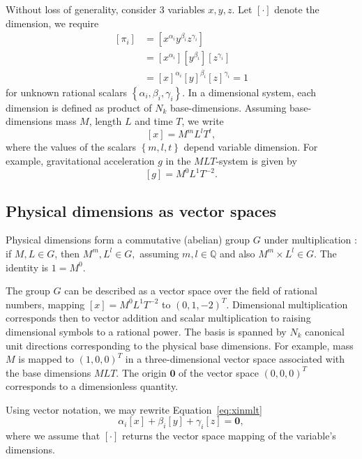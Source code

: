 \documentclass[11pt]{article}
\begin{document}
Without loss of generality, consider 3 variables $x,y,z$. Let $\left[\cdot\right]$ denote the dimension, we require
\begin{align}
    \left[\pi_i\right] &= \left[x^{\alpha_i}y^{\beta_i}z^{\gamma_i} \right] \\
    &=\left[x^{\alpha_i}\right]\left[y^{\beta_i}\right]\left[z^{\gamma_i}\right] \\
    &=\left[x\right]^{\alpha_i}\left[y\right]^{\beta_i}\left[z\right]^{\gamma_i} = 1 \label{eq:pi}    
\end{align}
for unknown rational scalars $\left\{\alpha_i,\beta_i,\gamma_i\right\}.$ In a dimensional system, each dimension is defined as product of $N_k$ base-dimensions. Assuming base-dimensions mass $M$, length $L$ and time $T$, we write 
\begin{equation}
    \left[x\right] = M^mL^lT^t, \label{eq:xinmlt}
\end{equation}
where the values of the scalars $\left\{m,l,t\right\}$ depend variable dimension. For example, gravitational acceleration $g$ in the $MLT$-system is given by
\begin{equation}
    \left[g\right] = M^0L^1T^{-2}.
\end{equation}

\subsection{Physical dimensions as vector spaces}
Physical dimensions form a commutative (abelian) group $G$ under multiplication : if $M,L \in G$, then $M^m,L^l \in G,$ assuming $m,l \in \mathbb{Q}$ and also $M^m \times L^l \in G$. The identity is $1 = M^0$.

The group $G$ can be described as a vector space over the field of rational numbers, mapping $[x] = M^0L^1T^{-2}$ to $(0,1,-2)^T$. Dimensional multiplication corresponds then to vector addition and scalar multiplication to raising dimensional symbols to a rational power. The basis is spanned by $N_k$ canonical unit directions corresponding to the physical base dimensions. For example, mass $M$ is mapped to $(1,0,0)^T$ in a three-dimensional vector space associated with the base dimensions $MLT$. The origin $\mathbf{0}$ of the vector space $(0,0,0)^T$ corresponds to a dimensionless quantity.

Using vector notation, we may rewrite Equation~\ref{eq:xinmlt}
\begin{equation}
    \alpha_i[x] + \beta_i[y] + \gamma_i[z] = \mathbf{0}, \label{eq:zeroeq}
\end{equation}
where we assume that $\left[\cdot\right]$ returns the vector space mapping of the variable's dimensions. 
\end{document}

